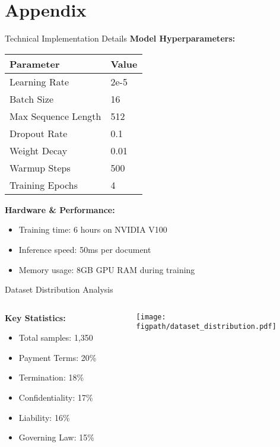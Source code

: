 
\section{Appendix}

\begin{frame}{Technical Implementation Details}
\textbf{Model Hyperparameters:}
\begin{table}[h]
\centering
\begin{tabular}{@{}ll@{}}
\toprule
\textbf{Parameter} & \textbf{Value} \\
\midrule
Learning Rate & 2e-5 \\
Batch Size & 16 \\
Max Sequence Length & 512 \\
Dropout Rate & 0.1 \\
Weight Decay & 0.01 \\
Warmup Steps & 500 \\
Training Epochs & 4 \\
\bottomrule
\end{tabular}
\end{table}

\vspace{0.5cm}
\textbf{Hardware \& Performance:}
\begin{itemize}
    \item Training time: 6 hours on NVIDIA V100
    \item Inference speed: 50ms per document
    \item Memory usage: 8GB GPU RAM during training
\end{itemize}
\end{frame}

\begin{frame}{Dataset Distribution Analysis}
\begin{columns}
\begin{column}{0.5\textwidth}
\textbf{Key Statistics:}
\begin{itemize}
    \item Total samples: 1,350
    \item Payment Terms: 20\%
    \item Termination: 18\%
    \item Confidentiality: 17\%
    \item Liability: 16\%
    \item Governing Law: 15\%
\end{itemize}
\end{column}
\begin{column}{0.5\textwidth}
\begin{center}
\texttt{[image: \\figpath/dataset\_distribution.pdf]}
\end{center}
\end{column}
\end{columns}
\end{frame}

